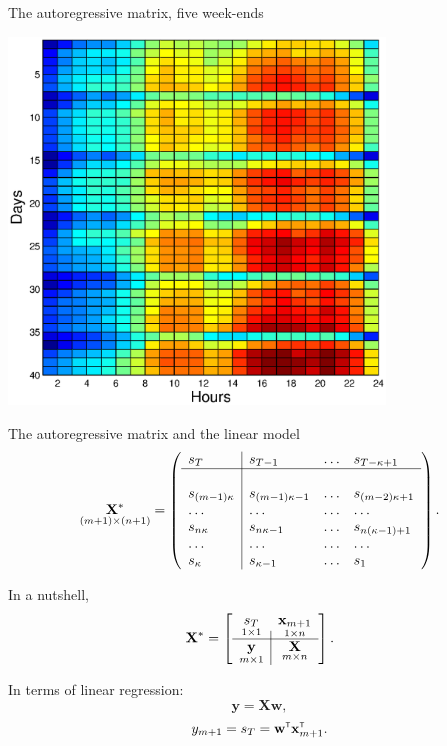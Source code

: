 \documentclass{beamer}
\begin{document}
\begin{frame}[t]{The autoregressive matrix, five week-ends}

\begin{center}
{\includegraphics[width=0.75\textwidth]{fig/Weeks5.eps}}
\end{center}

\end{frame}
\begin{frame}{The autoregressive matrix and the linear model}
$$
\underset{(m+1)\times(n+1)}{\mathbf{X}^*}  =
\left(%
\begin{array}{l|lll}
s_T                 & s_{T-1}           & \ldots & s_{T-\kappa +1}      \\
\hline                                                                  \\
s_{(m-1)\kappa }    & s_{(m-1)\kappa -1}& \ldots & s_{(m-2)\kappa +1}   \\
\ldots              & \ldots            & \ldots & \ldots               \\
s_{n\kappa }        & s_{n\kappa -1}    & \ldots & s_{n(\kappa -1)+1}   \\
\ldots              & \ldots            & \ldots & \ldots               \\
s_\kappa            & s_{\kappa -1}     & \ldots & s_1                  \\
\end{array}%
\right).
$$

\bigskip
In a nutshell,
$$
\mathbf{X}^*=\left[
\begin{array}{c|c}
 \underset{1{\times}1}{s_T} & \underset{1{\times}n}{{\mathbf{x}}_{m+1}} \\
 \hline
 \underset{m{\times}1}{\mathbf{y}} & \underset{m{\times}n}{\mathbf{X}} \\
\end{array}
\right].
$$

In terms of linear regression:
$$
\mathbf{y} = \mathbf{X}\mathbf{w},
$$
$$
y_{m+1} = s_T = {\mathbf{w}}^{\text{\tiny\sffamily\upshape\mdseries T}}{\mathbf{x}}_{m+1}^{\text{\tiny\sffamily\upshape\mdseries T}}.
$$
\end{frame}
\end{document}
